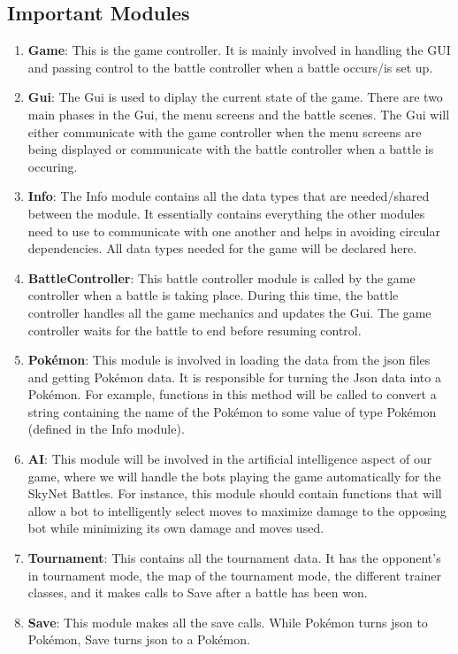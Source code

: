 \documentclass{scrreprt}
\begin{document}
\subsection{Important Modules}

\begin{enumerate}
	\item \textbf{Game}: This is the game controller. It is mainly involved in handling the GUI and passing control to the battle controller when a battle occurs/is set up.
	\item \textbf{Gui}: The Gui is used to diplay the current state of the game. There are two main phases in the Gui, the menu screens and the battle scenes. The Gui will either communicate with the game controller when the menu screens are being displayed or communicate with the battle controller when a battle is occuring.
	\item \textbf{Info}: The Info module contains all the data types that are needed/shared between the module. It essentially contains everything the other modules need to use to communicate with one another and helps in avoiding circular dependencies. All data types needed for the game will be declared here.
	\item \textbf{BattleController}: This battle controller module is called by the game controller when a battle is taking place. During this time, the battle controller handles all the game mechanics and updates the Gui. The game controller waits for the battle to end before resuming control.
	\item \textbf{Pok\'emon}: This module is involved in loading the data from the json files and getting Pok\'emon data. It is responsible for turning the Json data into a Pok\'emon. For example, functions in this method will be called to convert a string containing the name of the Pok\'emon to some value of type Pok\'emon (defined in the Info module). 
	\item \textbf{AI}: This module will be involved in the artificial intelligence aspect of our game, where we will handle the bots playing the game automatically for the SkyNet Battles. For instance, this module should contain functions that will allow a bot to intelligently select moves to maximize damage to the opposing bot while minimizing its own damage and moves used. 
	\item \textbf{Tournament}: This contains all the tournament data. It has the opponent's in tournament mode, the map of the tournament mode, the different trainer classes, and it makes calls to Save after a battle has been won.
	\item \textbf{Save}: This module makes all the save calls. While Pok\'emon turns json to Pok\'emon, Save turns json to a Pok\'emon. 
\end{enumerate}
\end{document}
